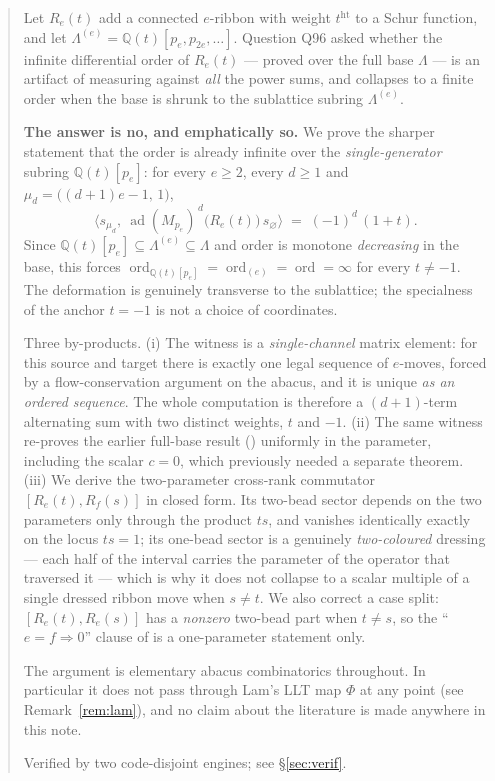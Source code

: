 \documentclass[11pt]{article}
\theoremstyle{definition}
\DeclareMathOperator{\ord}{ord}
\DeclareMathOperator{\ad}{ad}
\newcommand{\hgt}{\operatorname{ht}}   %
\newcommand{\Q}{\mathbb{Q}}
\newcommand{\Lam}{\Lambda}
\begin{document}
\begin{abstract}
Let $R_e(t)$ add a connected $e$-ribbon with weight $t^{\hgt}$ to a Schur function, and let
$\Lam^{(e)}=\Q(t)[p_e,p_{2e},\dots]$.  Question Q96 asked whether the infinite differential
order of $R_e(t)$ --- proved over the full base $\Lam$ --- is an artifact of measuring
against \emph{all} the power sums, and collapses to a finite order when the base is shrunk
to the sublattice subring $\Lam^{(e)}$.

\textbf{The answer is no, and emphatically so.}  We prove the sharper statement that the
order is already infinite over the \emph{single-generator} subring $\Q(t)[p_e]$:
for every $e\ge2$, every $d\ge1$ and $\mu_d=\bigl((d+1)e-1,\,1\bigr)$,
\[
  \bigl\langle s_{\mu_d},\ \ad(M_{p_e})^{\,d}\bigl(R_e(t)\bigr)\,s_\varnothing\bigr\rangle
  \;=\;(-1)^{d}\,(1+t).
\]
Since $\Q(t)[p_e]\subseteq\Lam^{(e)}\subseteq\Lam$ and order is monotone \emph{decreasing}
in the base, this forces $\ord_{\Q(t)[p_e]}=\ord_{(e)}=\ord=\infty$ for every $t\neq-1$.
The deformation is genuinely transverse to the sublattice; the specialness of the anchor
$t=-1$ is not a choice of coordinates.

Three by-products.  (i) The witness is a \emph{single-channel} matrix element: for this
source and target there is exactly one legal sequence of $e$-moves, forced by a
flow-conservation argument on the abacus, and it is unique \emph{as an ordered sequence}.
The whole computation is therefore a $(d+1)$-term alternating sum with two distinct
weights, $t$ and $-1$.  (ii) The same witness re-proves the earlier full-base result
(\cite[Cor.~4.9]{Clio0906}) uniformly in the parameter, including the scalar $c=0$, which
previously needed a separate theorem.  (iii) We derive the two-parameter cross-rank
commutator $[R_e(t),R_f(s)]$ in closed form.  Its two-bead sector depends on the two
parameters only through the product $ts$, and vanishes identically exactly on the locus
$ts=1$; its one-bead sector is a genuinely \emph{two-coloured} dressing --- each half of
the interval carries the parameter of the operator that traversed it --- which is why it
does not collapse to a scalar multiple of a single dressed ribbon move when $s\neq t$.  We
also correct a case split: $[R_e(t),R_e(s)]$ has a \emph{nonzero} two-bead part when
$t\neq s$, so the ``$e=f\Rightarrow0$'' clause of \cite[Thm.~2.3(2)]{Clio0907} is a
one-parameter statement only.

The argument is elementary abacus combinatorics throughout.  In particular it does not
pass through Lam's LLT map $\Phi$ at any point (see Remark~\ref{rem:lam}), and no claim
about the literature is made anywhere in this note.

Verified by two code-disjoint engines; see \S\ref{sec:verif}.
\end{abstract}
\end{document}
